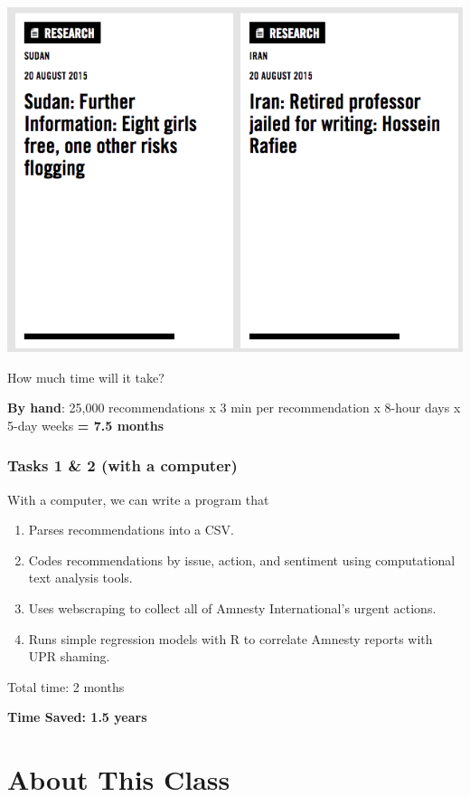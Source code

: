 \documentclass[
]{book}
\providecommand{\tightlist}{%
  \setlength{\itemsep}{0pt}\setlength{\parskip}{0pt}}
\begin{document}
\begin{center}\includegraphics[width=0.7\linewidth]{img/amnesty} \end{center}

How much time will it take?

\textbf{By hand}: 25,000 recommendations x 3 min per recommendation x 8-hour days x 5-day weeks \textbf{= 7.5 months}

\hypertarget{tasks-1-2-with-a-computer}{%
\subsubsection*{Tasks 1 \& 2 (with a computer)}\label{tasks-1-2-with-a-computer}}

With a computer, we can write a program that

\begin{enumerate}
\def\labelenumi{\arabic{enumi}.}
\tightlist
\item
  Parses recommendations into a CSV.
\item
  Codes recommendations by issue, action, and sentiment using computational text analysis tools.
\item
  Uses webscraping to collect all of Amnesty International's urgent actions.
\item
  Runs simple regression models with R to correlate Amnesty reports with UPR shaming.
\end{enumerate}

Total time: 2 months

\textbf{Time Saved: 1.5 years}

\hypertarget{about-this-class}{%
\section{About This Class}\label{about-this-class}}
\end{document}
